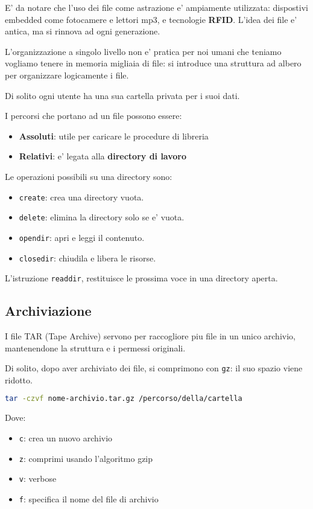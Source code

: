 E' da notare che l'uso dei file come astrazione e' ampiamente utilizzata: dispostivi embedded come fotocamere e lettori mp3, e tecnologie \textbf{RFID}.
L'idea dei file e' antica, ma si rinnova ad ogni generazione.

L'organizzazione a singolo livello non e' pratica per noi umani che teniamo vogliamo tenere in memoria
migliaia di file: si introduce una struttura ad albero per organizzare logicamente i file.

Di solito ogni utente ha una sua cartella privata per i suoi dati.

I percorsi che portano ad un file possono essere:
\begin{itemize}
    \item \textbf{Assoluti}: utile per caricare le procedure di libreria
    \item \textbf{Relativi}: e' legata alla \textbf{directory di lavoro}
\end{itemize}

Le operazioni possibili su una directory sono:
\begin{itemize}
    \item \texttt{create}: crea una directory vuota.
    \item \texttt{delete}: elimina la directory solo se e' vuota.
    \item \texttt{opendir}: apri e leggi il contenuto.
    \item \texttt{closedir}: chiudila e libera le risorse.
\end{itemize}

L'istruzione \texttt{readdir}, restituisce le prossima voce in una directory aperta.

\subsection{Archiviazione}
I file TAR (Tape Archive) servono per raccogliore piu file in un unico archivio, mantenendone la struttura
e i permessi originali. 

Di solito, dopo aver archiviato dei file, si comprimono con \texttt{gz}: il suo spazio viene ridotto.

\begin{lstlisting}[language=bash]
    tar -czvf nome-archivio.tar.gz /percorso/della/cartella
\end{lstlisting}
Dove:
\begin{itemize}
    \item \texttt{c}: crea un nuovo archivio
    \item \texttt{z}: comprimi usando l'algoritmo gzip
    \item \texttt{v}: verbose
    \item \texttt{f}: specifica il nome del file di archivio
\end{itemize}

